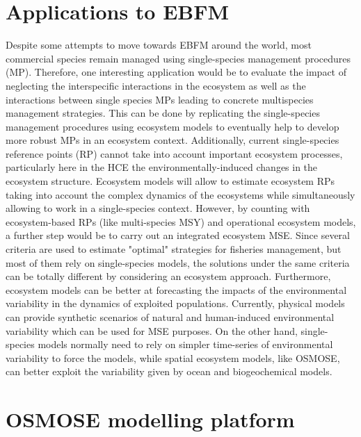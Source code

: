 \section*{Applications to EBFM}


Despite some attempts to move towards EBFM around the world, most commercial species remain managed using single-species management procedures (MP). Therefore, one interesting application would be to evaluate the impact of neglecting the interspecific interactions in the ecosystem as well as the interactions between single species MPs leading to concrete multispecies management strategies. This can be done by replicating the single-species management procedures using ecosystem models to eventually help to develop more robust MPs in an ecosystem context. Additionally, current single-species reference points (RP) cannot take into account important ecosystem processes, particularly here in the HCE the environmentally-induced changes in the ecosystem structure. Ecosystem models will allow to estimate ecosystem RPs taking into account the complex dynamics of the ecosystems while simultaneously allowing to work in a single-species context. However, by counting with ecosystem-based RPs (like multi-species MSY) and operational ecosystem models, a further step would be to carry out an integrated ecosystem MSE. Since several criteria are used to estimate "optimal" strategies for fisheries management, but most of them rely on single-species models, the solutions under the same criteria can be totally different by considering an ecosystem approach. Furthermore, ecosystem models can be better at forecasting the impacts of the environmental variability in the dynamics of exploited populations. Currently, physical models can provide synthetic scenarios of natural and human-induced environmental variability which can be used for MSE purposes. On the other hand, single-species models normally need to rely on simpler time-series of environmental variability to force the models, while spatial ecosystem models, like OSMOSE, can better exploit the variability given by ocean and biogeochemical models.


\section*{OSMOSE modelling platform}


